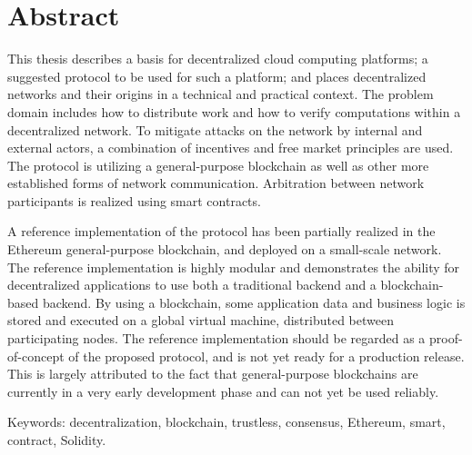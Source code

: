 
\thispagestyle{plain}			%
\section*{Abstract}
This thesis describes a basis for decentralized cloud computing platforms; a suggested protocol to be used for such a platform; and places decentralized networks and their origins in a technical and practical context. The problem domain includes how to distribute work and how to verify computations within a decentralized network. To mitigate attacks on the network by internal and external actors, a combination of incentives and free market principles are used. The protocol is utilizing a general-purpose blockchain as well as other more established forms of network communication. Arbitration between network participants is realized using smart contracts.

A reference implementation of the protocol has been partially realized in the Ethereum general-purpose blockchain, and deployed on a small-scale network. The reference implementation is highly modular and demonstrates the ability for decentralized applications to use both a traditional backend and a blockchain-based backend. By using a blockchain, some application data and business logic is stored and executed on a global virtual machine, distributed between participating nodes. The reference implementation should be regarded as a proof-of-concept of the proposed protocol, and is not yet ready for a production release. This is largely attributed to the fact that general-purpose blockchains are currently in a very early development phase and can not yet be used reliably.


\vfill
\noindent Keywords: decentralization, blockchain, trustless, consensus, Ethereum, smart, \\contract, Solidity. 

\newpage				%
\thispagestyle{empty}
\mbox{}